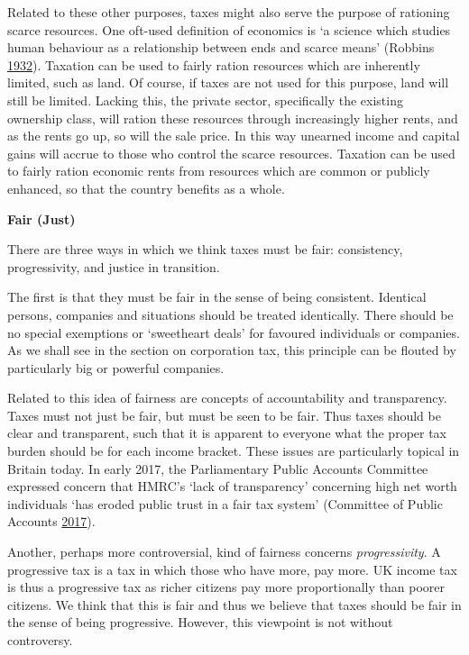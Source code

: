 \documentclass[]{tufte-handout}
\begin{document}
Related to these other purposes, taxes might also serve the purpose of
rationing scarce resources. One oft-used definition of economics is `a
science which studies human behaviour as a relationship between ends and
scarce means' (Robbins \protect\hyperlink{ref-robbins1932}{1932}).
Taxation can be used to fairly ration resources which are inherently
limited, such as land. Of course, if taxes are not used for this
purpose, land will still be limited. Lacking this, the private sector,
specifically the existing ownership class, will ration these resources
through increasingly higher rents, and as the rents go up, so will the
sale price. In this way unearned income and capital gains will accrue to
those who control the scarce resources. Taxation can be used to fairly
ration economic rents from resources which are common or publicly
enhanced, so that the country benefits as a whole.

\textbf{Fair (Just)}

There are three ways in which we think taxes must be fair: consistency,
progressivity, and justice in transition.

The first is that they must be fair in the sense of being consistent.
Identical persons, companies and situations should be treated
identically. There should be no special exemptions or `sweetheart deals'
for favoured individuals or companies. As we shall see in the section on
corporation tax, this principle can be flouted by particularly big or
powerful companies.

Related to this idea of fairness are concepts of accountability and
transparency. Taxes must not just be fair, but must be seen to be fair.
Thus taxes should be clear and transparent, such that it is apparent to
everyone what the proper tax burden should be for each income bracket.
These issues are particularly topical in Britain today. In early 2017,
the Parliamentary Public Accounts Committee expressed concern that
HMRC's `lack of transparency' concerning high net worth individuals `has
eroded public trust in a fair tax system' (Committee of Public Accounts
\protect\hyperlink{ref-HoC2017}{2017}).

Another, perhaps more controversial, kind of fairness concerns
\emph{progressivity}. A progressive tax is a tax in which those who have
more, pay more. UK income tax is thus a progressive tax as richer
citizens pay more proportionally than poorer citizens. We think that
this is fair and thus we believe that taxes should be fair in the sense
of being progressive. However, this viewpoint is not without
controversy.
\end{document}
